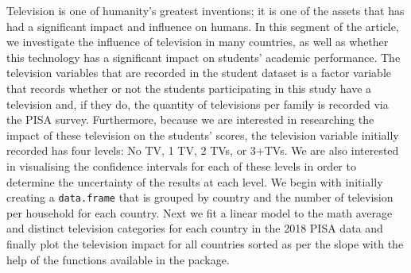 Television is one of humanity's greatest inventions; it is one of the
assets that has had a significant impact and influence on humans. In
this segment of the article, we investigate the influence of television
in many countries, as well as whether this technology has a significant
impact on students' academic performance. The television variables that
are recorded in the student dataset is a factor variable that records
whether or not the students participating in this study have a
television and, if they do, the quantity of televisions per family is
recorded via the PISA survey. Furthermore, because we are interested in
researching the impact of these television on the students' scores, the
television variable initially recorded has four levels: No TV, 1 TV, 2
TVs, or 3+TVs. We are also interested in visualising the confidence
intervals for each of these levels in order to determine the uncertainty
of the results at each level. We begin with initially creating a
\texttt{data.frame} that is grouped by country and the number of
television per household for each country. Next we fit a linear model to
the math average and distinct television categories for each country in
the 2018 PISA data and finally plot the television impact for all
countries sorted as per the slope with the help of the functions
available in the  \citep{ggplot2} package.

